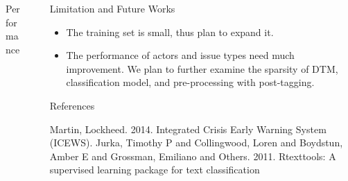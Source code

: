 \documentclass[final]{beamer}
\newlength{\sepwid}
\newlength{\onecolwid}
\newlength{\threecolwid}
\begin{document}
\begin{frame}[t]
\begin{columns}[t]
\begin{column}{\threecolwid}
\begin{columns}[t,totalwidth=\threecolwid]
\begin{column}{\onecolwid}
\begin{block}{Performance}
\end{block}


\end{column} %

\begin{column}{\sepwid}\end{column} %




\begin{column}{\onecolwid} %



\begin{block}{Limitation and Future Works}

\begin{itemize}
\item The training set is small, thus plan to expand it.
\item The performance of actors and issue types need much improvement. We plan to further examine the sparsity of DTM, classification model, and pre-processing with post-tagging.
\end{itemize}

\end{block}


\begin{block}{References}
\begin{thebibliography}{2}
 Martin, Lockheed. 2014. Integrated Crisis Early Warning System (ICEWS).
 Jurka, Timothy P and Collingwood, Loren and Boydstun, Amber E and Grossman, Emiliano and Others. 2011. Rtexttools: A supervised learning package for text classification


\end{thebibliography}
\end{block}
\end{column}
\end{columns}
\end{column}
\end{columns}
\end{frame}
\end{document}
